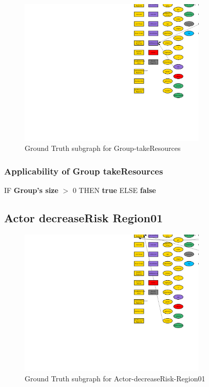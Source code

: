 \documentclass{article}%
\begin{document}
\begin{figure}[ht]%
\centering%
\includegraphics[width=0.8\textwidth]{images/Group-takeResources.png}%
\caption{Ground Truth subgraph for Group{-}takeResources}%
\end{figure}

%
\subsubsection{Applicability of Group takeResources}%
\label{ssubsec:Applicability of Group takeResources}%
\begin{flushleft}%
IF %
\textbf{Group's size}%
$>$%
0%
\linebreak%
\hspace*{2em}%
THEN %
\textbf{true}%
\linebreak%
\hspace*{2em}%
ELSE %
\textbf{false}%
\end{flushleft}

%
\subsection{Actor decreaseRisk Region01}%
\label{subsec:Actor decreaseRisk Region01}%


\begin{figure}[ht]%
\centering%
\includegraphics[width=0.8\textwidth]{images/Actor-decreaseRisk-Region01.png}%
\caption{Ground Truth subgraph for Actor{-}decreaseRisk{-}Region01}%
\end{figure}
\end{document}
